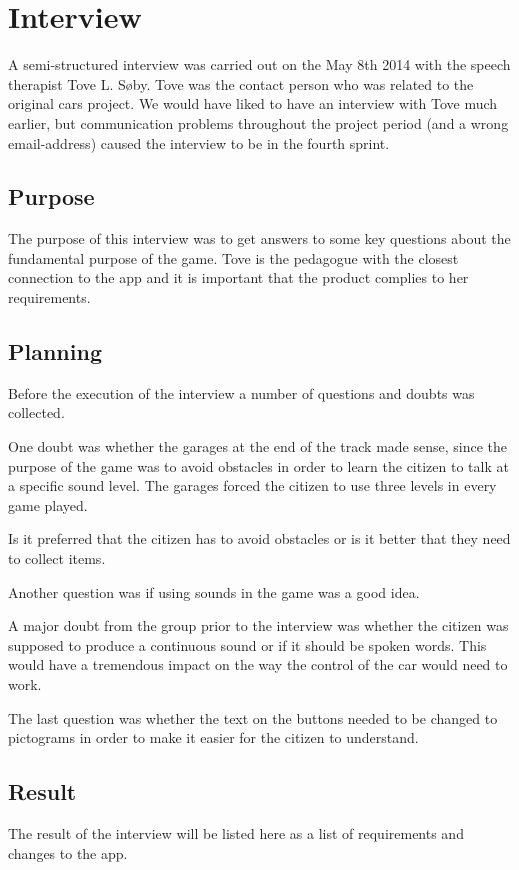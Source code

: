 \section{Interview}\label{s4_interview}

A semi-structured interview \cite{deb} was carried out on the May 8th 2014 with the speech therapist Tove L. Søby.
Tove was the contact person who was related to the original cars project.\cite{oldcars}
We would have liked to have an interview with Tove much earlier, but communication problems throughout the project period (and a wrong email-address) caused the interview to be in the fourth sprint.

\subsection{Purpose}
The purpose of this interview was to get answers to some key questions about the fundamental purpose of the game. 
Tove is the pedagogue with the closest connection to the app and it is important that the product complies to her requirements.

\subsection{Planning}
Before the execution of the interview a number of questions and doubts was collected.


One doubt was whether the garages at the end of the track made sense, since the purpose of the game was to avoid obstacles in order to learn the citizen to talk at a specific sound level.
The garages forced the citizen to use three levels in every game played.

Is it preferred that the citizen has to avoid obstacles or is it better that they need to collect items. 

Another question was if using sounds in the game was a good idea.

A major doubt from the group prior to the interview was whether the citizen was supposed to produce a continuous sound or if it should be spoken words.
This would have a tremendous impact on the way the control of the car would need to work.

The last question was whether the text on the buttons needed to be changed to pictograms in order to make it easier for the citizen to understand.

\subsection{Result}
The result of the interview will be listed here as a list of requirements and changes to the app.

